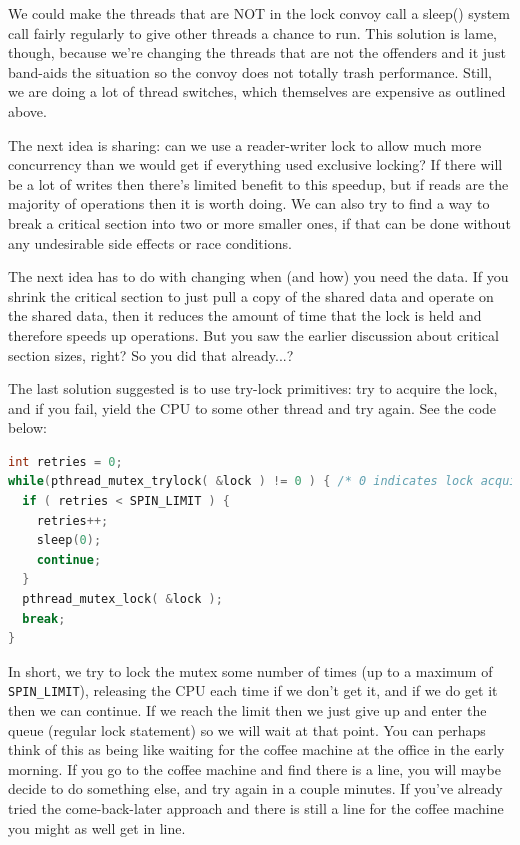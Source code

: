 \documentclass[a4paper]{report}
\begin{document}
We could make the threads that are NOT in the lock convoy call a sleep() system call fairly regularly to give other threads a chance to run. This solution is lame, though, because we're changing the threads that are not the offenders and it just band-aids the situation so the convoy does not totally trash performance. Still, we are doing a lot of thread switches, which themselves are expensive as outlined above.

The next idea is sharing: can we use a reader-writer lock to allow much more concurrency than we would get if everything used exclusive locking? If there will be a lot of writes then there's limited benefit to this speedup, but if reads are the majority of operations then it is worth doing. We can also try to find a way to break a critical section into two or more smaller ones, if that can be done without any undesirable side effects or race conditions.

The next idea has to do with changing when (and how) you need the data. If you shrink the critical section to just pull a copy of the shared data and operate on the shared data, then it reduces the amount of time that the lock is held and therefore speeds up operations. But you saw the earlier discussion about critical section sizes, right? So you did that already...?

The last solution suggested is to use try-lock primitives: try to acquire the lock, and if you fail, yield the CPU to some other thread and try again. See the code below:

\begin{lstlisting}[language=C]
int retries = 0;
while(pthread_mutex_trylock( &lock ) != 0 ) { /* 0 indicates lock acquired */
  if ( retries < SPIN_LIMIT ) {
    retries++;
    sleep(0);
    continue;
  }
  pthread_mutex_lock( &lock );
  break;
}
\end{lstlisting}

In short, we try to lock the mutex some number of times (up to a maximum of \texttt{SPIN\_LIMIT}), releasing the CPU each time if we don't get it, and if we do get it then we can continue. If we reach the limit then we just give up and enter the queue (regular lock statement) so we will wait at that point. You can perhaps think of this as being like waiting for the coffee machine at the office in the early morning. If you go to the coffee machine and find there is a line, you will maybe decide to do something else, and try again in a couple minutes. If you've already tried the come-back-later approach and there is still a line for the coffee machine you might as well get in line.
\end{document}
